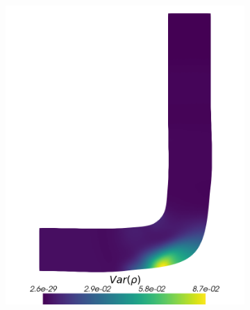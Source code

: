 \begin{figure}[H]
\begin{subfigure}{0.3\linewidth}
		\includegraphics[scale=0.18]{figs/pipe/pipe_sc_ref_n50_Var(rho).png}
		\caption{}
		\label{fig:referenceSolutionsPipe2}
	\end{subfigure}
	\hfill
	\begin{subfigure}{0.3\linewidth}
		\centering

\end{subfigure}
\end{figure}

